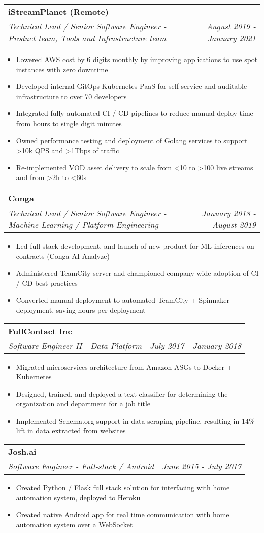 \documentclass[letterpaper,11pt]{article}
\makeatletter
\newcommand{\resumeItemNoBold}[1]{
  \item\small{
    {#1 \vspace{-2pt}}
  }
}
\newcommand{\resumeSubheading}[3]{
  \vspace{-1pt}\item
    \begin{tabular*}{0.97\textwidth}{l@{\extracolsep{\fill}}r}
      \textbf{#1} \\
      \textit{\small#2} & \textit{\small #3} \\
    \end{tabular*}\vspace{-5pt}
}
\newcommand{\resumeItemListStart}{\begin{itemize}}
\newcommand{\resumeItemListEnd}{\end{itemize}\vspace{-5pt}}
\makeatother
\begin{document}
    \resumeSubheading
      {iStreamPlanet (Remote)}
      {Technical Lead / Senior Software Engineer - Product team, Tools and Infrastructure team}{August 2019 - January 2021}
      \resumeItemListStart
        \resumeItemNoBold {Lowered AWS cost by 6 digits monthly by improving applications to use spot instances with zero downtime}
        \resumeItemNoBold {Developed internal GitOps Kubernetes PaaS for self service and auditable infrastructure to over 70 developers}
        \resumeItemNoBold {Integrated fully automated CI / CD pipelines to reduce manual deploy time from hours to single digit minutes}
        \resumeItemNoBold {Owned performance testing and deployment of Golang services to support \textgreater10k QPS and \textgreater1Tbps of traffic}
        \resumeItemNoBold {Re-implemented VOD asset delivery to scale from \textless10 to \textgreater100 live streams and from \textgreater2h to \textless60s}
      \resumeItemListEnd
    \resumeSubheading
      {Conga}
      {Technical Lead / Senior Software Engineer - Machine Learning / Platform Engineering}{January
        2018 - August 2019}
      \resumeItemListStart
        \resumeItemNoBold {Led full-stack development, and launch of new product for ML inferences on contracts (Conga AI Analyze)}
        \resumeItemNoBold {Administered TeamCity server and championed company wide adoption of CI / CD best practices}
        \resumeItemNoBold {Converted manual deployment to automated TeamCity + Spinnaker deployment, saving hours per deployment}
      \resumeItemListEnd

    \resumeSubheading
      {FullContact Inc}
      {Software Engineer II - Data Platform}{July 2017 - January 2018}
      \resumeItemListStart
        \resumeItemNoBold {Migrated microservices architecture from Amazon ASGs to Docker + Kubernetes}
        \resumeItemNoBold {Designed, trained, and deployed a text classifier for determining the organization and department for a job title}
        \resumeItemNoBold {Implemented Schema.org support in data scraping pipeline, resulting in 14\% lift in data extracted from websites}
      \resumeItemListEnd

    \resumeSubheading
      {Josh.ai}
      {Software Engineer - Full-stack / Android}{June 2015 - July 2017}
      \resumeItemListStart
        \resumeItemNoBold{Created Python / Flask full stack solution for interfacing with home automation system, deployed to Heroku}
        \resumeItemNoBold{Created native Android app for real time communication with home automation system over a WebSocket}
      \resumeItemListEnd
\end{document}
